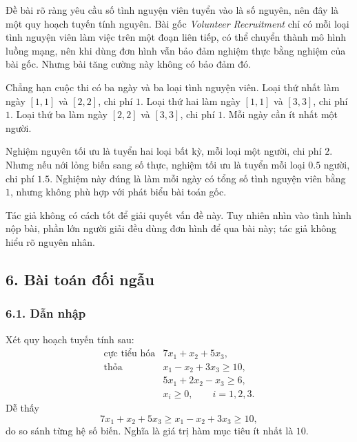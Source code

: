 \documentclass[11pt]{article}
\begin{document}
Đề bài rõ ràng yêu cầu số tình nguyện viên tuyển vào là số nguyên, nên đây là
một quy hoạch tuyến tính nguyên. Bài gốc \emph{Volunteer Recruitment} chỉ có
mỗi loại tình nguyện viên làm việc trên một đoạn liên tiếp, có thể chuyển
thành mô hình luồng mạng, nên khi dùng đơn hình vẫn bảo đảm nghiệm thực bằng
nghiệm của bài gốc. Nhưng bài tăng cường này không có bảo đảm đó.

Chẳng hạn cuộc thi có ba ngày và ba loại tình nguyện viên. Loại thứ nhất làm
ngày \([1,1]\) và \([2,2]\), chi phí \(1\). Loại thứ hai làm ngày \([1,1]\)
và \([3,3]\), chi phí \(1\). Loại thứ ba làm ngày \([2,2]\) và \([3,3]\), chi
phí \(1\). Mỗi ngày cần ít nhất một người.

Nghiệm nguyên tối ưu là tuyển hai loại bất kỳ, mỗi loại một người, chi phí
\(2\). Nhưng nếu nới lỏng biến sang số thực, nghiệm tối ưu là tuyển mỗi loại
\(0.5\) người, chi phí \(1.5\). Nghiệm này đúng là làm mỗi ngày có tổng số
tình nguyện viên bằng \(1\), nhưng không phù hợp với phát biểu bài toán gốc.

Tác giả không có cách tốt để giải quyết vấn đề này. Tuy nhiên nhìn vào tình
hình nộp bài, phần lớn người giải đều dùng đơn hình để qua bài này; tác giả
không hiểu rõ nguyên nhân.

\subsection*{6. Bài toán đối ngẫu}

\subsubsection*{6.1. Dẫn nhập}

Xét quy hoạch tuyến tính sau:
\[
\begin{array}{ll}
\text{cực tiểu hóa} & 7x_1+x_2+5x_3,\\
\text{thỏa} & x_1-x_2+3x_3\ge 10,\\
& 5x_1+2x_2-x_3\ge 6,\\
& x_i\ge 0,\qquad i=1,2,3.
\end{array}
\]
Dễ thấy
\[
  7x_1+x_2+5x_3\ge x_1-x_2+3x_3\ge 10,
\]
do so sánh từng hệ số biến. Nghĩa là giá trị hàm mục tiêu ít nhất là \(10\).
\end{document}
